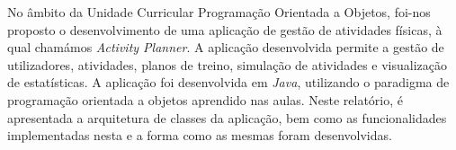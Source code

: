 \documentclass[a4paper,12pt]{scrreprt}
\begin{document}



\makecover



\renewenvironment{abstract}
 {\par\noindent\textbf{\Large\abstractname}\par\bigskip}
 {}

\begin{flushleft}
\begin{abstract}
    No âmbito da Unidade Curricular Programação Orientada a Objetos, foi-nos proposto o
    desenvolvimento de uma aplicação de gestão de atividades físicas, à qual chamámos \textit{Activity Planner}.
    A aplicação desenvolvida permite a gestão de utilizadores, atividades, planos de treino, simulação de atividades e
    visualização de estatísticas. A aplicação foi desenvolvida em \textit{Java}, utilizando o paradigma de programação
    orientada a objetos aprendido nas aulas. Neste relatório, é apresentada a arquitetura de classes da aplicação, bem
    como as funcionalidades implementadas nesta e a forma como as mesmas foram desenvolvidas.
\end{abstract}
\end{flushleft}



\renewcommand{\contentsname}{Índice}

\tableofcontents
\end{document}
